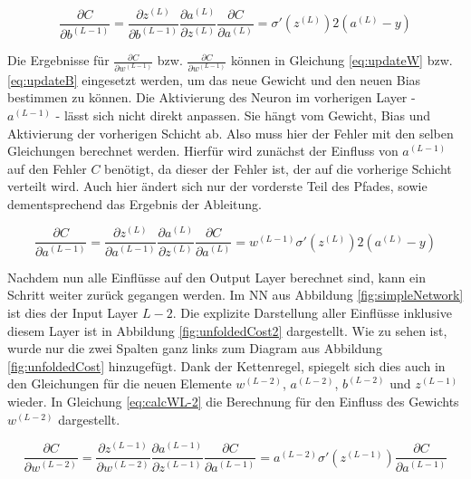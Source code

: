 \begin{equation}
    \frac{\partial C }{\partial b^{(L-1)}} =  
    \frac{\partial z^{(L)} }{\partial b^{(L-1)}}
    \frac{\partial a^{(L)} }{\partial z^{(L)}}
    \frac{\partial C }{\partial a^{(L)}} =  \sigma'(z^{(L)})
    2(a^{(L)}-y)
\end{equation}

Die Ergebnisse für $\frac{\partial C }{\partial w^{(L-1)}}$  bzw. $\frac{\partial C }{\partial w^{(L-1)}}$ können in Gleichung \ref{eq:updateW} bzw. \ref{eq:updateB} eingesetzt werden, um das neue Gewicht und den neuen Bias bestimmen zu können. Die Aktivierung des Neuron im vorherigen Layer - $a^{(L-1)}$ - lässt sich nicht direkt anpassen. Sie hängt vom Gewicht, Bias und Aktivierung der vorherigen Schicht ab. Also muss hier der Fehler mit den selben Gleichungen berechnet werden. Hierfür wird zunächst der Einfluss von $a^{(L-1)}$ auf den Fehler $C$ benötigt, da dieser der Fehler ist, der auf die vorherige Schicht verteilt wird. Auch hier ändert sich nur der vorderste Teil des Pfades, sowie dementsprechend das Ergebnis der Ableitung.

\begin{equation} \label{eq:partialCpartialaL-1}
    \frac{\partial C }{\partial a^{(L-1)}} =  
    \frac{\partial z^{(L)} }{\partial a^{(L-1)}}
    \frac{\partial a^{(L)} }{\partial z^{(L)}}
    \frac{\partial C }{\partial a^{(L)}} = w^{(L-1)}\sigma'(z^{(L)})
    2(a^{(L)}-y)
\end{equation}

Nachdem nun alle Einflüsse auf den Output Layer berechnet sind, kann ein Schritt weiter zurück gegangen werden. Im \ac{NN} aus Abbildung \ref{fig:simpleNetwork} ist dies der Input Layer $L-2$. Die explizite Darstellung aller Einflüsse inklusive diesem Layer ist in Abbildung \ref{fig:unfoldedCost2} dargestellt. Wie zu sehen ist, wurde nur die zwei Spalten ganz links zum Diagram aus Abbildung \ref{fig:unfoldedCost} hinzugefügt. Dank der Kettenregel, spiegelt sich dies auch in den Gleichungen für die neuen Elemente $w^{(L-2)}$, $a^{(L-2)}$, $b^{(L-2)}$ und $z^{(L-1)}$ wieder. In Gleichung \ref{eq:calcWL-2}  die Berechnung für den Einfluss des Gewichts $w^{(L-2)}$ dargestellt.

\begin{equation} \label{eq:calcWL-2}
    \frac{\partial C }{\partial w^{(L-2)}} = 
    \frac{\partial z^{(L-1)} }{\partial w^{(L-2)}}
    \frac{\partial a^{(L-1)} }{\partial z^{(L-1)}}
    \frac{\partial C }{\partial a^{(L-1)}} = 
    a^{(L-2)}\sigma'(z^{(L-1)}) \frac{\partial C}{\partial a^{(L-1)}}
\end{equation}

